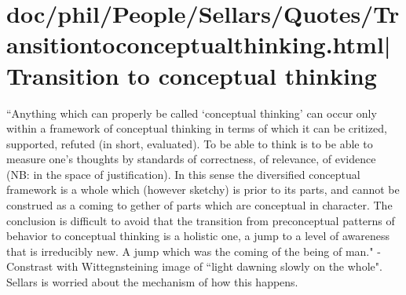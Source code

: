 \documentclass[12pt,a4paper]{report}
\begin{document}
\section{doc/phil/People/Sellars/Quotes/Transitiontoconceptualthinking.html|Transition to conceptual thinking}
``Anything which can properly be called `conceptual thinking' can occur only within a framework of conceptual thinking in terms of which it can be critized, supported, refuted (in short, evaluated). To be able to think is to be able to measure one's thoughts by standards of correctness, of relevance, of evidence (NB: in the space of justification). In this sense the diversified conceptual framework is a whole which (however sketchy) is prior to its parts, and cannot be construed as a coming to gether of parts which are conceptual in character. The conclusion is difficult to avoid that the transition from preconceptual patterns of behavior to conceptual thinking is a holistic one, a jump to a level of awareness that is irreducibly new. A jump which was the coming of the being of man." - Constrast with Wittegnsteining image of ``light dawning slowly on the whole". Sellars is worried about the mechanism of how this happens.



\end{document}
